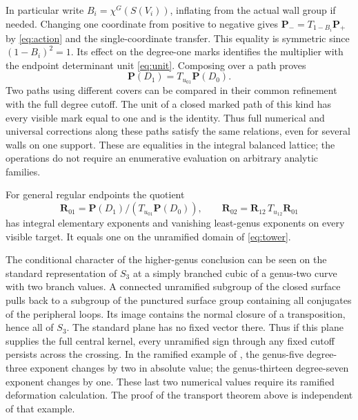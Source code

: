 In particular write \(B_i=\chi^G(S(V_i))\), inflating from the actual wall group if needed. Changing one coordinate from positive to negative gives \(\mathbf P_-=T_{1-B_i}\mathbf P_+\) by \eqref{eq:action} and the single-coordinate transfer. This equality is symmetric since \((1-B_i)^2=1\). Its effect on the degree-one marks identifies the multiplier with the endpoint determinant unit \eqref{eq:unit}. Composing over a path proves
\begin{equation}
\mathbf P(D_1)=T_{u_{01}}\mathbf P(D_0).          \label{eq:tower}
\end{equation}
Two paths using different covers can be compared in their common refinement with the full degree cutoff. The unit of a closed marked path of this kind has every visible mark equal to one and is the identity. Thus full numerical and universal corrections along these paths satisfy the same relations, even for several walls on one support. These are equalities in the integral balanced lattice; the operations do not require an enumerative evaluation on arbitrary analytic families.

For general regular endpoints the quotient
\[\mathbf R_{01}=\mathbf P(D_1)/(T_{u_{01}}\mathbf P(D_0)),
       \qquad \mathbf R_{02}=\mathbf R_{12}\,T_{u_{12}}\mathbf R_{01}\]
has integral elementary exponents and vanishing least-genus exponents on every visible target. It equals one on the unramified domain of \eqref{eq:tower}.

The conditional character of the higher-genus conclusion can be seen
on the standard representation of \(S_3\) at a simply branched cubic
of a genus-two curve with two branch values. A connected unramified
subgroup of the closed surface pulls back to a subgroup of the
punctured surface group containing all conjugates of the peripheral
loops. Its image contains the normal closure of a transposition,
hence all of \(S_3\). The standard plane has no fixed vector there.
Thus if this plane supplies the full central kernel, every unramified
sign through any fixed cutoff persists across the crossing.
In the ramified example of \cite[Theorems~1.1--1.2]{WueBranched}, the
genus-five degree-three exponent changes by two in absolute value;
the genus-thirteen degree-seven exponent changes by one. These last
two numerical values require its ramified deformation calculation.
The proof of the transport theorem above is independent of that example.
